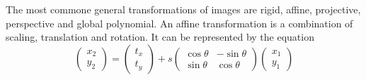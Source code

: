 \documentclass[11pt]{book}
\theoremstyle{example}
\begin{document}
The most commone general transformations of images are rigid, affine, projective, perspective and global polynomial. An affine transformation is a combination of scaling, translation and rotation. It can be represented by the equation
\begin{equation}
	\begin{pmatrix}
		x_2\\
		y_2
	\end{pmatrix}=
	\begin{pmatrix}
		t_x\\
		t_y
	\end{pmatrix}+
	s\begin{pmatrix}
		\cos{\theta}&-\sin{\theta}\\
		\sin{\theta}&\cos{\theta}
	\end{pmatrix}
	\begin{pmatrix}
		x_1\\
		y_1
	\end{pmatrix}
\end{equation}

\backmatter
\end{document}
